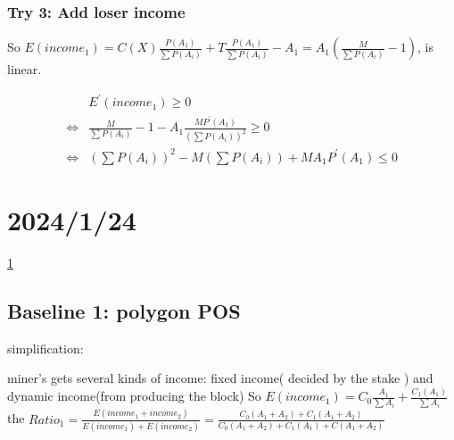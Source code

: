 \documentclass{article}
\begin{document}
\subsubsection{Try 3: Add loser income}
\par So $E(income_1)=C(X)\frac{P(A_1)}{\sum P(A_i)}+T\frac{P(A_1)}{\sum P(A_i)}-A_1=A_1(\frac{M}{\sum P(A_i)}-1)$, is linear.
 \par
 \begin{equation}
\begin{aligned}
&E^{'}(income_1)\ge 0
\\\Longleftrightarrow&\frac{M}{\sum P(A_i)}-1-A_1\frac{MP^{'}(A_1)}{(\sum P(A_i))^2}\ge 0
\\\Longleftrightarrow&(\sum P(A_i))^2-M(\sum P(A_i))+MA_1P^{'}(A_1)\le 0
\end{aligned}
\end{equation}

\section{2024/1/24}
\href{https://eips.ethereum.org/EIPS/eip-225}{1}%
\subsection{Baseline 1: polygon POS }
\par simplification:
\par miner's gets several kinds of income: fixed income( decided by the stake ) and dynamic income(from producing the block)
So $E(income_1)=C_0\frac{A_1}{\sum A_i}+\frac{C_1(A_1)}{\sum A_i}$
the $Ratio_1=\frac{E(income_1+income_2)}{E(income_1)+E(income_2)}=\frac{C_0(A_1+A_2)+C_1(A_1+A_2)}{C_0(A_1+A_2)+C_1(A_1)+C(A_1+A_2)}$
\end{document}
